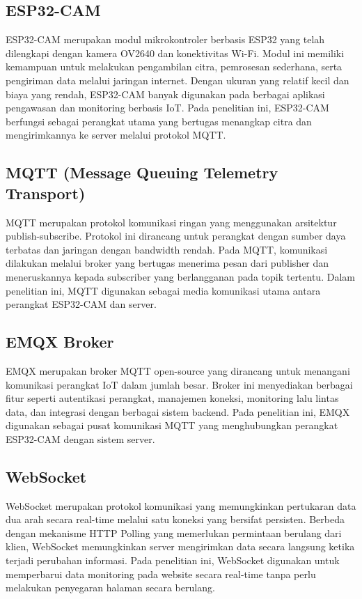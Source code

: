 \subsection{ESP32-CAM}

ESP32-CAM merupakan modul mikrokontroler berbasis ESP32 yang telah dilengkapi dengan kamera OV2640 dan konektivitas Wi-Fi. Modul ini memiliki kemampuan untuk melakukan pengambilan citra, pemrosesan sederhana, serta pengiriman data melalui jaringan internet. Dengan ukuran yang relatif kecil dan biaya yang rendah, ESP32-CAM banyak digunakan pada berbagai aplikasi pengawasan dan monitoring berbasis IoT. Pada penelitian ini, ESP32-CAM berfungsi sebagai perangkat utama yang bertugas menangkap citra dan mengirimkannya ke server melalui protokol MQTT.

\subsection{MQTT (Message Queuing Telemetry Transport)}

MQTT merupakan protokol komunikasi ringan yang menggunakan arsitektur publish-subscribe. Protokol ini dirancang untuk perangkat dengan sumber daya terbatas dan jaringan dengan bandwidth rendah. Pada MQTT, komunikasi dilakukan melalui broker yang bertugas menerima pesan dari publisher dan meneruskannya kepada subscriber yang berlangganan pada topik tertentu. Dalam penelitian ini, MQTT digunakan sebagai media komunikasi utama antara perangkat ESP32-CAM dan server.

\subsection{EMQX Broker}

EMQX merupakan broker MQTT open-source yang dirancang untuk menangani komunikasi perangkat IoT dalam jumlah besar. Broker ini menyediakan berbagai fitur seperti autentikasi perangkat, manajemen koneksi, monitoring lalu lintas data, dan integrasi dengan berbagai sistem backend. Pada penelitian ini, EMQX digunakan sebagai pusat komunikasi MQTT yang menghubungkan perangkat ESP32-CAM dengan sistem server.

\subsection{WebSocket}

WebSocket merupakan protokol komunikasi yang memungkinkan pertukaran data dua arah secara real-time melalui satu koneksi yang bersifat persisten. Berbeda dengan mekanisme HTTP Polling yang memerlukan permintaan berulang dari klien, WebSocket memungkinkan server mengirimkan data secara langsung ketika terjadi perubahan informasi. Pada penelitian ini, WebSocket digunakan untuk memperbarui data monitoring pada website secara real-time tanpa perlu melakukan penyegaran halaman secara berulang.

